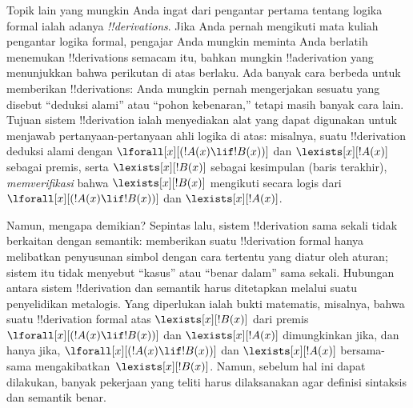 \documentclass[../../../include/open-logic-section]{subfiles}
\begin{document}
Topik lain yang mungkin Anda ingat dari pengantar pertama tentang logika
formal ialah adanya \emph{!!{derivation}s}. Jika Anda pernah mengikuti mata
kuliah pengantar logika formal, pengajar Anda mungkin meminta Anda berlatih
menemukan !!{derivation}s semacam itu, bahkan mungkin !!a{derivation} yang
menunjukkan bahwa perikutan di atas berlaku. Ada banyak cara berbeda untuk
memberikan !!{derivation}s: Anda mungkin pernah mengerjakan sesuatu yang
disebut ``deduksi alami'' atau ``pohon kebenaran,'' tetapi masih banyak cara
lain. Tujuan sistem !!{derivation} ialah menyediakan alat yang dapat digunakan
untuk menjawab pertanyaan-pertanyaan ahli logika di atas: misalnya, suatu
!!{derivation} deduksi alami dengan
$\lforall[x][(!A(x) \lif !B(x))]$ dan $\lexists[x][!A(x)]$ sebagai premis,
serta $\lexists[x][!B(x)]$ sebagai kesimpulan (baris terakhir),
\emph{memverifikasi} bahwa $\lexists[x][!B(x)]$ mengikuti secara logis dari
$\lforall[x][(!A(x) \lif !B(x))]$ dan $\lexists[x][!A(x)]$.

Namun, mengapa demikian? Sepintas lalu, sistem !!{derivation} sama sekali
tidak berkaitan dengan semantik: memberikan suatu !!{derivation} formal hanya
melibatkan penyusunan simbol dengan cara tertentu yang diatur oleh aturan;
sistem itu tidak menyebut ``kasus'' atau ``benar dalam'' sama sekali. Hubungan
antara sistem !!{derivation} dan semantik harus ditetapkan melalui suatu
penyelidikan metalogis. Yang diperlukan ialah bukti matematis, misalnya,
bahwa suatu !!{derivation} formal atas $\lexists[x][!B(x)]$ dari premis
$\lforall[x][(!A(x) \lif !B(x))]$ dan $\lexists[x][!A(x)]$ dimungkinkan jika,
dan hanya jika, $\lforall[x][(!A(x) \lif !B(x))]$ dan
$\lexists[x][!A(x)]$ bersama-sama mengakibatkan~$\lexists[x][!B(x)]$.
Namun, sebelum hal ini dapat dilakukan, banyak pekerjaan yang teliti harus
dilaksanakan agar definisi sintaksis dan semantik benar.
\end{document}
